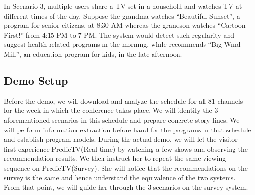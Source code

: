 In Scenario 3, multiple users share a TV set in a household
and watches TV at different times of the day. Suppose the grandma watches
``Beautiful Sunset'', a program for senior citizens, at 8:30 AM whereas
the grandson watches ``Cartoon First!'' from 4:15 PM to 7 PM.
The system would detect such regularity and suggest health-related programs
in the morning, while recommends ``Big Wind Mill'', an education program for
kids, in the late afternoon.

%

\subsection{Demo Setup}

%
Before the demo, we will download and analyze the schedule for all 
81 channels for the week in which the conference takes place. 
We will identify the 3 aforementioned scenarios in this 
schedule and prepare concrete story lines. 
We will perform information extraction before hand for the programs in
that schedule and establish program models. 
During the actual demo, we will let the visitor first experience 
PredicTV(Real-time) by watching a few shows and observing the recommendation 
results. We then instruct her to repeat the same viewing sequence on
PredicTV(Survey). She will notice that the recommendations on the
survey is the same and hence understand the equivalence of the two systems.
From that point, we will guide her through the 3 scenarios on the survey
system.
%
%
%
%
